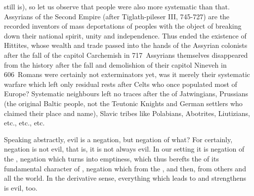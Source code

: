 {  still is), so let us observe that people were also more systematic than that.
  Assyrians of the Second Empire (after Tiglath-pileser III, 745-727\bc) are the
  recorded inventors of mass deportations of peoples with the object of breaking
  down their national spirit, unity and independence. Thus ended the existence
  of Hittites, whose wealth and trade passed into the hands of the Assyrian
  colonists after the fall of the capitol Carchemish in 717\bc\ Assyrians
  themselves disappeared from the history after the fall and demolishion of
  their capitol Nineveh in 606\bc\ Romans were certainly not exterminators yet,
  was it merely their systematic warfare which left only residual rests after
  Celts who once populated most of Europe?  Systematic neighbours left no traces
  after the  of Jatwingians, Prussians (the original
  Baltic people, not the Teutonic Knights and German settlers who claimed their
  place and name), Slavic tribes like Polabians, Abotrites, Liutizians, etc.,
  etc., etc.}

Speaking abstractly, evil is a negation, but negation of what?  For certainly,
negation is not evil, that is, it is not always evil.
In our setting it is negation of the , negation which turns
 into emptiness, which thus berefts the  of its
fundamental character of , negation which
  from the , and then, from others and all 
the world. In the derivative sense, everything which leads to and 
strengthens  is evil, too.

